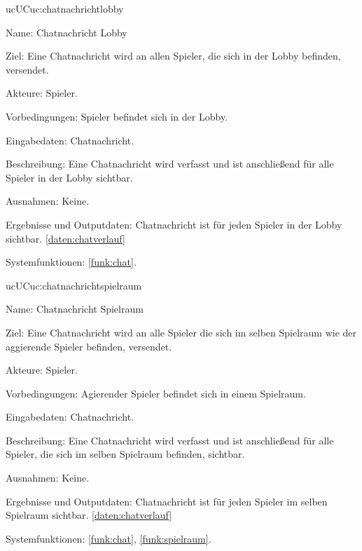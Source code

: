 \begin{description}[leftmargin=5em, style=sameline]
		\begin{lhp}{uc}{UC}{uc:chatnachrichtlobby}
		\item [Name:]Chatnachricht Lobby
		\item [Ziel:]Eine Chatnachricht wird an allen Spieler, die sich in der Lobby befinden, versendet.
		\item [Akteure:]Spieler. 
		\item [Vorbedingungen:]Spieler befindet sich in der Lobby.
		\item [Eingabedaten:]Chatnachricht.
		\item [Beschreibung:] Eine Chatnachricht wird verfasst und ist anschließend für alle Spieler in der Lobby sichtbar.
		\item [Ausnahmen:]Keine.
		\item [Ergebnisse und Outputdaten:] Chatnachricht ist für jeden Spieler in der Lobby sichtbar. \ref{daten:chatverlauf}
		\item [Systemfunktionen:]  \ref{funk:chat}.
	\end{lhp}
	
	\begin{lhp}{uc}{UC}{uc:chatnachrichtspielraum}
		\item [Name:]Chatnachricht Spielraum
		\item [Ziel:]Eine Chatnachricht wird an alle Spieler die sich im selben Spielraum wie der aggierende Spieler befinden, versendet.
		\item [Akteure:]Spieler. 
		\item [Vorbedingungen:]Agierender Spieler befindet sich in einem Spielraum.
		\item [Eingabedaten:]Chatnachricht.
		\item [Beschreibung:]Eine Chatnachricht wird verfasst und ist anschließend für alle Spieler, die sich im selben Spielraum befinden, sichtbar.
		\item [Ausnahmen:]Keine.
		\item [Ergebnisse und Outputdaten:] Chatnachricht ist für jeden Spieler im selben Spielraum sichtbar. \ref{daten:chatverlauf}
		\item [Systemfunktionen:]  \ref{funk:chat}, \ref{funk:spielraum}.
	\end{lhp}
	

\end{description}
